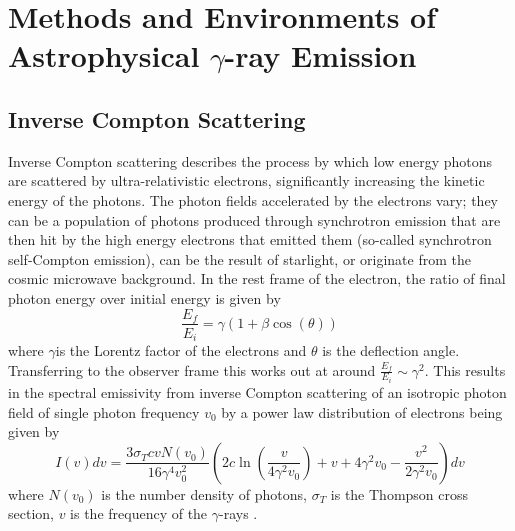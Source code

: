 \section{Methods and Environments of Astrophysical $\gamma$-ray Emission}
\subsection{Inverse Compton Scattering}

Inverse Compton scattering describes the process by which low energy photons are scattered by ultra-relativistic electrons, significantly increasing the kinetic energy of the photons. The photon fields accelerated by the electrons vary; they can be a population of photons produced through synchrotron emission that are then hit by the high energy electrons that emitted them (so-called synchrotron self-Compton emission), can be the result of starlight, or originate from the cosmic microwave background. In the rest frame of the electron, the ratio of final photon energy over initial energy is given by
\begin{equation}
    \frac{E_f}{E_i}=\gamma (1+\beta \cos(\theta))
\end{equation}
where $\gamma$is the Lorentz factor of the electrons and $\theta$ is the deflection angle. Transferring to the observer frame this works out at around $\frac{E_f}{E_i}\sim \gamma^2$. This results in the spectral emissivity from inverse Compton scattering of an isotropic photon field of single photon frequency $v_0$ by a power law distribution of electrons being given by 
\begin{equation}
    I(v)dv=\frac{3\sigma_TcvN(v_0)}{16\gamma^4v_0^2}\left(2c\ln\left(\frac{v}{4\gamma^2v_0}\right)+v+4\gamma^2v_0-\frac{v^2}{2\gamma^2v_0}\right)dv
\end{equation}
where $N(v_0)$ is the number density of photons, $\sigma_T$ is the Thompson cross section, $v$ is the frequency of the $\gamma$-rays \cite{blumenthal}.


